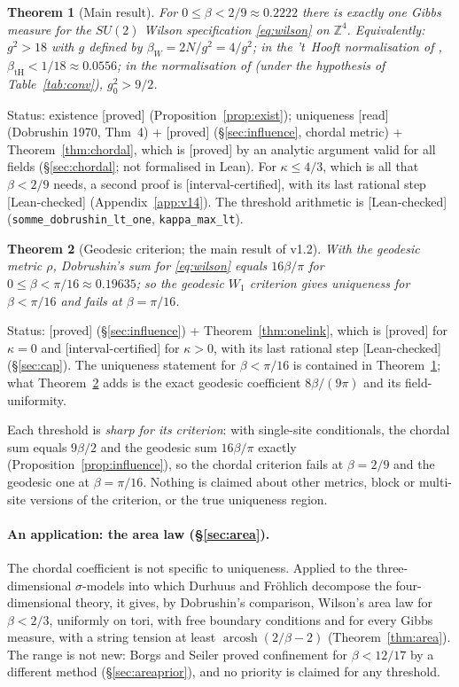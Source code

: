 \documentclass[11pt,a4paper]{article}
\newtheorem{theorem}{Theorem}
\theoremstyle{remark}
\theoremstyle{definition}
\theoremstyle{plain}
\theoremstyle{remark}
\DeclareMathOperator{\arcosh}{arcosh}
\newcommand{\Z}{\mathbb{Z}}
\newcommand{\st}[1]{\textsf{[#1]}}
\begin{document}
\begin{theorem}[Main result]\label{thm:main}
For $0\le\beta<2/9\approx0.2222$ there is exactly one Gibbs measure for the $SU(2)$ Wilson
specification \eqref{eq:wilson} on $\Z^4$.
Equivalently: $g^2>18$ with $g$ defined by $\beta_W=2N/g^2=4/g^2$; in the 't~Hooft normalisation of
\cite{SZZ23}, $\beta_{\mathrm{tH}}<1/18\approx0.0556$; in the normalisation of \cite{OS78} (under the hypothesis
of Table~\ref{tab:conv}), $g_0^2>9/2$.
\end{theorem}
\noindent Status: existence \st{proved} (Proposition~\ref{prop:exist});
uniqueness \st{read} (Dobrushin 1970, Thm~4) + \st{proved} (\S\ref{sec:influence}, chordal metric) +
Theorem~\ref{thm:chordal}, which is \st{proved} by an analytic argument valid for all fields (\S\ref{sec:chordal}; not formalised in Lean).
For $\kappa\le4/3$, which is all that $\beta<2/9$ needs, a second proof is \st{interval-certified}, with its last rational
step \st{Lean-checked} (Appendix~\ref{app:v14}). The threshold arithmetic is \st{Lean-checked}
(\texttt{somme\_dobrushin\_lt\_one}, \texttt{kappa\_max\_lt}).

\begin{theorem}[Geodesic criterion; the main result of v1.2]\label{thm:geo}
With the geodesic metric $\rho$, Dobrushin's sum for \eqref{eq:wilson} equals $16\beta/\pi$ for
$0\le\beta<\pi/16\approx0.19635$; so the geodesic $W_1$ criterion gives uniqueness for $\beta<\pi/16$ and fails at
$\beta=\pi/16$.
\end{theorem}
\noindent Status: \st{proved} (\S\ref{sec:influence}) + Theorem~\ref{thm:onelink}, which is \st{proved} for
$\kappa=0$ and \st{interval-certified} for $\kappa>0$, with its last rational step \st{Lean-checked}
(\S\ref{sec:cap}). The uniqueness statement for $\beta<\pi/16$ is contained in Theorem~\ref{thm:main}; what
Theorem~\ref{thm:geo} adds is the exact geodesic coefficient $8\beta/(9\pi)$ and its field-uniformity.

Each threshold is \emph{sharp for its criterion}: with single-site conditionals, the chordal sum equals $9\beta/2$
and the geodesic sum $16\beta/\pi$ exactly (Proposition~\ref{prop:influence}), so the chordal criterion fails at
$\beta=2/9$ and the geodesic one at $\beta=\pi/16$. Nothing is claimed about other metrics, block or multi-site
versions of the criterion, or the true uniqueness region.

\paragraph{An application: the area law (\S\ref{sec:area}).} The chordal coefficient is not specific to uniqueness. Applied to the
three-dimensional $\sigma$-models into which Durhuus and Fr\"ohlich \cite{DF80} decompose the four-dimensional theory, it gives, by
Dobrushin's comparison, Wilson's area law for $\beta<2/3$, uniformly on tori, with free boundary conditions and for every Gibbs
measure, with a string tension at least $\arcosh(2/\beta-2)$ (Theorem~\ref{thm:area}). The range is not new: Borgs and Seiler
\cite{BS83} proved confinement for $\beta<12/17$ by a different method (\S\ref{sec:areaprior}), and no priority is claimed for any threshold.
\end{document}
